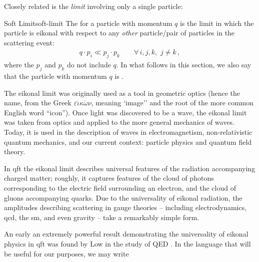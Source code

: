Closely related is the \textit{ limit} involving only a single particle:
\begin{definitionbox}{Soft Limit}{soft-limit}
    The  for a particle with momentum \(q\) is the limit in which the particle is eikonal with respect to any \textit{other} particle/pair of particles in the scattering event:
    \begin{align}
        q \cdot p_i \ll p_j \cdot p_k
        \qquad
        \forall\,i,j,k,
        \,\,
        j\neq k
        \,,
    \end{align}
    where the \(p_j\) and \(p_k\) do not include \(q\).
    In what follows in this section, we also say that the particle with momentum \(q\) is .
\end{definitionbox}


The eikonal limit was originally used as a tool in geometric optics (hence the name, from the Greek \(\varepsilon \acute{\iota}\kappa \acute{\omega}\nu\), meaning `image'' and the root of the more common English word ``icon'').
%
Once light was discovered to be a wave, the eikonal limit was taken from optics and applied to the more general mechanics of waves.
%
Today, it is used in the description of waves in electromagnetism, non-relativistic quantum mechanics, and our current context:
%
particle physics and quantum field theory.

In \gls{qft} the eikonal limit describes universal features of the radiation accompanying charged matter;
%
roughly, it captures features of the cloud of photons corresponding to the electric field surrounding an electron, and the cloud of gluons accompanying quarks.
%
Due to the universality of eikonal radiation, the amplitudes describing scattering in gauge theories -- including electrodynamics, \gls{qcd}, the \gls{sm}, and even gravity -- take a remarkably simple form.

An early an extremely powerful result demonstrating the universality of eikonal physics in \gls{qft} was found by Low in the study of QED \cite{Low:1958sn}.
%
In the language that will be useful for our purposes, we may write

